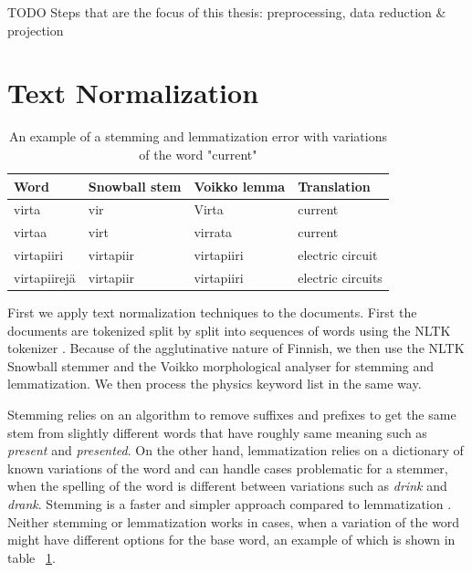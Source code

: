 \documentclass[utf8,english]{gradu3}
\begin{document}
TODO Steps that are the focus of this thesis: preprocessing, data reduction \& projection 



\section{Text Normalization}

\begin{table}[]
  \begin{tabular}{ | l | l | l | l | }
  \hline
  \textbf{Word} & \textbf{Snowball stem} & \textbf{Voikko lemma} & \textbf{Translation} \\ \hline
  virta & vir & Virta & current\\ \hline
  virtaa & virt & virrata & current\\ \hline
  virtapiiri & virtapiir & virtapiiri & electric circuit\\ \hline
  virtapiirejä & virtapiir & virtapiiri & electric circuits\\
  \hline
  \end{tabular}
  \caption{An example of a stemming and lemmatization error with variations of the word "current"}
  \label{table:stemmer}
\end{table}

First we apply text normalization techniques to the documents. First the documents are tokenized split by split into sequences of words using the NLTK tokenizer \parencite{birdNaturalLanguageProcessing2009}. Because of the agglutinative nature of Finnish, we then use the NLTK Snowball stemmer \parencite{birdNaturalLanguageProcessing2009} and the Voikko morphological analyser \parencite{pitkanenVoikkoFreeLinguistic2019}  for stemming and lemmatization. We then process the physics keyword list in the same way. 

Stemming relies on an algorithm to remove suffixes and prefixes to get the same stem from slightly different words that have roughly same meaning such as \emph{present} and \emph{presented}. On the other hand, lemmatization relies on a dictionary of known variations of the word and can handle cases problematic for a stemmer, when the spelling of the word is different between variations such as \emph{drink} and \emph{drank}. Stemming is a faster and simpler approach compared to lemmatization \parencite{floresAssessingImpactStemming2016}. Neither stemming or lemmatization works in cases, when a variation of the word might have different options for the base word, an example of which is shown in table ~\ref{table:stemmer}.
\end{document}
